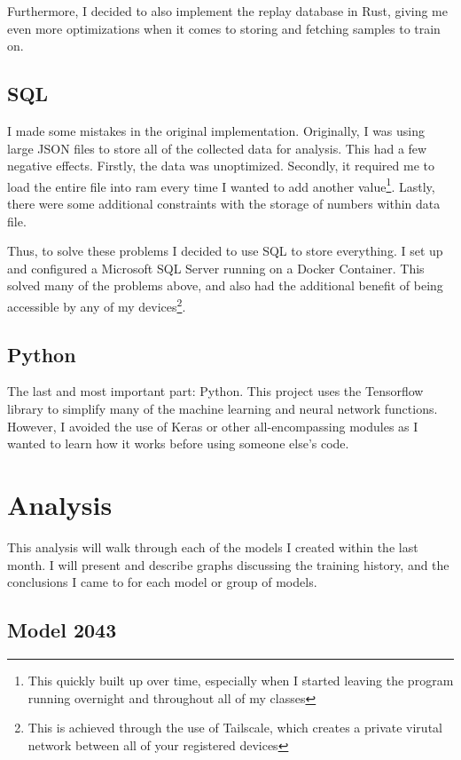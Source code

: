 \documentclass[12pt]{article}
\begin{document}
Furthermore, I decided to also implement the replay database in Rust, giving me even more optimizations when it comes to storing and fetching samples to train on.

\subsection{SQL}

I made some mistakes in the original implementation. Originally, I was using large JSON files to store all of the collected data for analysis. This had a few negative effects. Firstly, the data was unoptimized. Secondly, it required me to load the entire file into ram every time I wanted to add another value\footnote{This quickly built up over time, especially when I started leaving the program running overnight and throughout all of my classes}. Lastly, there were some additional constraints with the storage of numbers within data file.

Thus, to solve these problems I decided to use SQL to store everything. I set up and configured a Microsoft SQL Server running on a Docker Container. This solved many of the problems above, and also had the additional benefit of being accessible by any of my devices\footnote{This is achieved through the use of Tailscale, which creates a private virutal network between all of your registered devices}.

\subsection{Python}

The last and most important part: Python. This project uses the Tensorflow library to simplify many of the machine learning and neural network functions. However, I avoided the use of Keras or other all-encompassing modules as I wanted to learn how it works before using someone else's code.


\newpage

\section{Analysis}

This analysis will walk through each of the models I created within the last month. I will present and describe graphs discussing the training history, and the conclusions I came to for each model or group of models.

\subsection{Model 2043}
\end{document}
